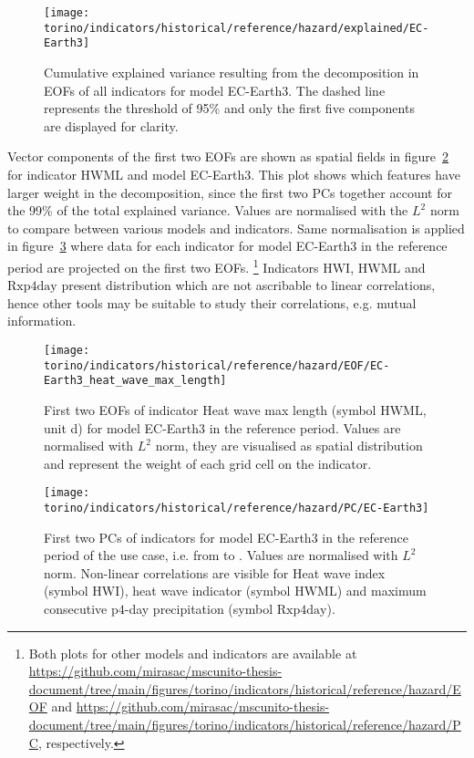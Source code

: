 \begin{figure}
  \centering
  \texttt{[image: torino/indicators/historical/reference/hazard/explained/EC-Earth3]}
  \caption{Cumulative explained variance resulting from the decomposition in \glspl{EOF} of all indicators for model EC-Earth3. The dashed line represents the threshold of 95\% and only the first five components are displayed for clarity.}
  \label{fig:explained_EC-Earth3}
\end{figure}

Vector components of the first two \glspl{EOF} are shown as spatial fields in figure~\ref{fig:EOF_EC-Earth3_heat_wave_max_length} for indicator $\mathrm{HWML}$ and model EC-Earth3. This plot shows which features have larger weight in the decomposition, since the first two \glspl{PC} together account for the 99\% of the total explained variance. Values are normalised with the $L^2$ norm to compare between various models and indicators. Same normalisation is applied in figure~\ref{fig:PC_EC-Earth3} where data for each indicator for model EC-Earth3 in the reference period are projected on the first two \glspl{EOF}.%
\footnote{Both plots for other models and indicators are available at \url{https://github.com/mirasac/mscunito-thesis-document/tree/main/figures/torino/indicators/historical/reference/hazard/EOF} and \url{https://github.com/mirasac/mscunito-thesis-document/tree/main/figures/torino/indicators/historical/reference/hazard/PC}, respectively.}
Indicators $\mathrm{HWI}$, $\mathrm{HWML}$ and $\mathrm{Rxp4day}$ present distribution which are not ascribable to linear correlations, hence other tools may be suitable to study their correlations, e.g. mutual information.

\begin{figure}
  \centering
  \texttt{[image: torino/indicators/historical/reference/hazard/EOF/EC-Earth3\_heat\_wave\_max\_length]}
  \caption{First two \glspl{EOF} of indicator {Heat wave max length} (symbol $\mathrm{HWML}$, unit \unit{\day}) for model EC-Earth3 in the reference period. Values are normalised with $L^2$ norm, they are visualised as spatial distribution and represent the weight of each grid cell on the indicator.}
  \label{fig:EOF_EC-Earth3_heat_wave_max_length}
\end{figure}

\begin{figure}
  \centering
  \texttt{[image: torino/indicators/historical/reference/hazard/PC/EC-Earth3]}
  \caption{First two \glspl{PC} of indicators for model EC-Earth3 in the reference period of the use case, i.e. from  to . Values are normalised with $L^2$ norm. Non-linear correlations are visible for {Heat wave index} (symbol $\mathrm{HWI}$), heat wave indicator (symbol $\mathrm{HWML}$) and maximum consecutive $\mathrm{p4}$-day precipitation (symbol $\mathrm{Rxp4day}$).}
  \label{fig:PC_EC-Earth3}
\end{figure}

